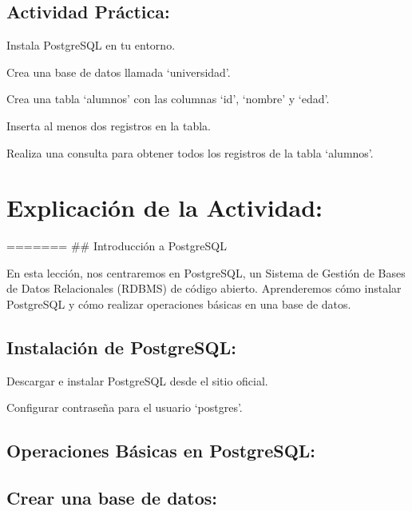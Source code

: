 \documentclass[
  a4paper,
  onepage,
  openany]{scrreprt}
\begin{document}
\hypertarget{actividad-pruxe1ctica-60}{%
\subsection{Actividad Práctica:}\label{actividad-pruxe1ctica-60}}

Instala PostgreSQL en tu entorno.

Crea una base de datos llamada `universidad'.

Crea una tabla `alumnos' con las columnas `id', `nombre' y `edad'.

Inserta al menos dos registros en la tabla.

Realiza una consulta para obtener todos los registros de la tabla
`alumnos'.

\hypertarget{explicaciuxf3n-de-la-actividad-66}{%
\section{Explicación de la
Actividad:}\label{explicaciuxf3n-de-la-actividad-66}}

======= \#\# Introducción a PostgreSQL

En esta lección, nos centraremos en PostgreSQL, un Sistema de Gestión de
Bases de Datos Relacionales (RDBMS) de código abierto. Aprenderemos cómo
instalar PostgreSQL y cómo realizar operaciones básicas en una base de
datos.

\hypertarget{instalaciuxf3n-de-postgresql-1}{%
\subsection{Instalación de
PostgreSQL:}\label{instalaciuxf3n-de-postgresql-1}}

Descargar e instalar PostgreSQL desde el sitio oficial.

Configurar contraseña para el usuario `postgres'.

\hypertarget{operaciones-buxe1sicas-en-postgresql-1}{%
\subsection{Operaciones Básicas en
PostgreSQL:}\label{operaciones-buxe1sicas-en-postgresql-1}}

\hypertarget{crear-una-base-de-datos-1}{%
\subsection{Crear una base de datos:}\label{crear-una-base-de-datos-1}}
\end{document}
